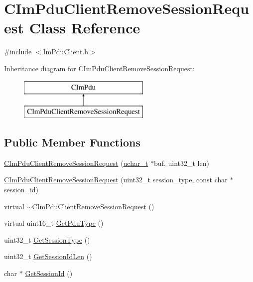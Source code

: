 \hypertarget{class_c_im_pdu_client_remove_session_request}{}\section{C\+Im\+Pdu\+Client\+Remove\+Session\+Request Class Reference}
\label{class_c_im_pdu_client_remove_session_request}


{\ttfamily \#include $<$Im\+Pdu\+Client.\+h$>$}

Inheritance diagram for C\+Im\+Pdu\+Client\+Remove\+Session\+Request\+:\begin{figure}[H]
\begin{center}
\leavevmode
\includegraphics[height=2.000000cm]{class_c_im_pdu_client_remove_session_request}
\end{center}
\end{figure}
\subsection*{Public Member Functions}
\begin{DoxyCompactItemize}
\item 
\hyperlink{class_c_im_pdu_client_remove_session_request_a7ef4eb0a11b920286e39261db8aeba85}{C\+Im\+Pdu\+Client\+Remove\+Session\+Request} (\hyperlink{base_2ostype_8h_a124ea0f8f4a23a0a286b5582137f0b8d}{uchar\+\_\+t} $\ast$buf, uint32\+\_\+t len)
\item 
\hyperlink{class_c_im_pdu_client_remove_session_request_ac630e765274b319c5af4e5473249df56}{C\+Im\+Pdu\+Client\+Remove\+Session\+Request} (uint32\+\_\+t session\+\_\+type, const char $\ast$session\+\_\+id)
\item 
virtual \hyperlink{class_c_im_pdu_client_remove_session_request_af99fd3f595428ca36817742b911c81f9}{$\sim$\+C\+Im\+Pdu\+Client\+Remove\+Session\+Request} ()
\item 
virtual uint16\+\_\+t \hyperlink{class_c_im_pdu_client_remove_session_request_a9159457999f1b3aa616b62d4b11e48da}{Get\+Pdu\+Type} ()
\item 
uint32\+\_\+t \hyperlink{class_c_im_pdu_client_remove_session_request_addbb54d86dd302fe3602aaaca1867f65}{Get\+Session\+Type} ()
\item 
uint32\+\_\+t \hyperlink{class_c_im_pdu_client_remove_session_request_a526f810a7ac53857c45261bc47724a26}{Get\+Session\+Id\+Len} ()
\item 
char $\ast$ \hyperlink{class_c_im_pdu_client_remove_session_request_aa41204e33559262a531359c43f14d44d}{Get\+Session\+Id} ()
\end{DoxyCompactItemize}
